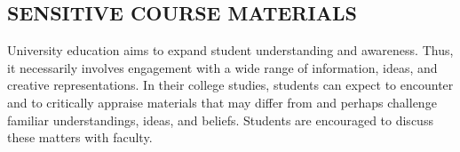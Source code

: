 \documentclass[
  letterpaper,
  DIV=11,
  numbers=noendperiod]{scrreprt}
\begin{document}
\hypertarget{sensitive-course-materials}{%
\subsection{SENSITIVE COURSE
MATERIALS}\label{sensitive-course-materials}}

University education aims to expand student understanding and awareness.
Thus, it necessarily involves engagement with a wide range of
information, ideas, and creative representations. In their college
studies, students can expect to encounter and to critically appraise
materials that may differ from and perhaps challenge familiar
understandings, ideas, and beliefs. Students are encouraged to discuss
these matters with faculty.
\end{document}
